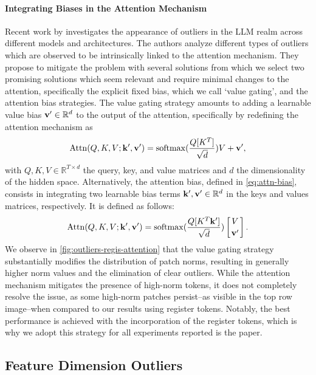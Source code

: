 \paragraph{Integrating Biases in the Attention Mechanism} 
Recent work by \citet{an2025systematic} investigates the appearance of outliers in the LLM realm across different models and architectures. The authors analyze different types of outliers which are observed to be intrinsically linked to the attention mechanism. They propose to mitigate the problem with several solutions from which we select two promising solutions which seem relevant and require minimal changes to the attention, specifically the explicit fixed bias, which we call `value gating', and the attention bias strategies.
The value gating strategy amounts to adding a learnable value bias $\mathrm{\bf v'} \in \mathbb{R}^d$ to the output of the attention, specifically by redefining the attention mechanism as 
\begin{equation}
    \mathrm{Attn}(Q,K,V; \mathrm{\bf k'}, \mathrm{\bf v'}) = \mathrm{softmax}(\frac{Q[K^T]}{\sqrt{d}})V + \mathrm{\bf v'}, 
    \label{eq:value-gatting}
\end{equation}
with $Q, K, V \in \mathbb{R}^{T\times d}$ the query, key, and value matrices and $d$ the dimensionality of the
hidden space. 
Alternatively, the attention bias, defined in \cref{eq:attn-bias}, consists in integrating two learnable bias terms $\mathrm{\bf k'}, \mathrm{\bf v'} \in \mathbb{R}^d$ in the keys and values matrices, respectively. It is defined as follows: 
\begin{equation}
    \mathrm{Attn}(Q,K,V; \mathrm{\bf k'}, \mathrm{\bf v'}) = \mathrm{softmax}(\frac{Q[K^T\mathrm{\bf k'}]}{\sqrt{d}}) \left[ \genfrac{}{}{0pt}{}{V}{\bf v'} \right]. 
    \label{eq:attn-bias}
\end{equation}
We observe in \cref{fig:outliers-regis-attention} that the value gating strategy substantially modifies the distribution of patch norms, resulting in generally higher norm values and the elimination of clear outliers. While the attention mechanism mitigates the presence of high-norm tokens, it does not completely resolve the issue, as some high-norm patches persist--as visible in the top row image--when compared to our results using register tokens. Notably, the best performance is achieved with the incorporation of the register tokens, which is why we adopt this strategy for all experiments reported is the paper.


\subsection{Feature Dimension Outliers}


